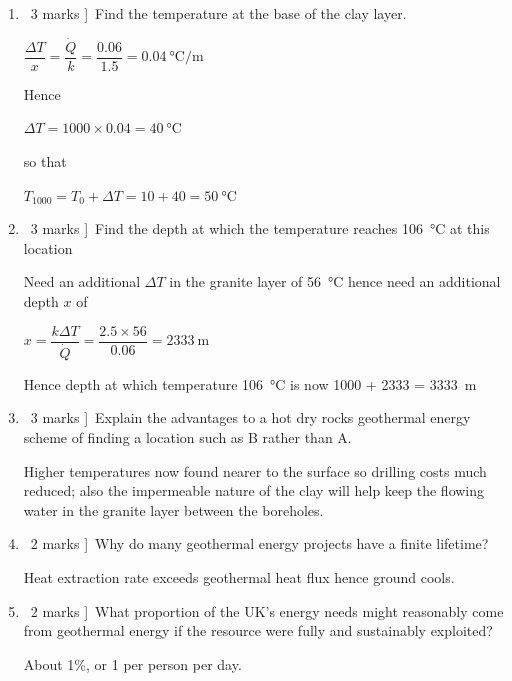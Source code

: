 \documentclass[a4paper,12pt,fleqn]{article}
\begin{document}
\begin{enumerate}[label=\alph*)]
\item \lbrack\ 3 marks ]\ Find the temperature at the base of the clay layer.\par
$\dfrac{\Delta T}{x}=\dfrac{\dot Q}{k}=\dfrac{0.06}{1.5}=\SI{0.04}{\celsius\per\metre}$\par
Hence\par
$\Delta T= 1000\times 0.04 = \SI{40}{\celsius}$\par
so that\par
$T_{1000}=T_0 + \Delta T = 10 + 40 = \SI{50}{\celsius}$\par
\item \lbrack\ 3 marks ]\ Find the depth at which the temperature reaches \SI{106}{\celsius} at this location\par
Need an additional $\Delta T$ in the granite layer of \SI{56}{\celsius} hence need an additional depth $x$ of\par
$x=\dfrac{k \Delta T}{\dot Q}=\dfrac{2.5\times 56}{0.06}=\SI{2333}{\metre}$\par
Hence depth at which temperature \SI{106}{\celsius} is now 1000 + 2333 = \SI{3333}{\metre}
\item \lbrack\ 3 marks ]\ Explain the advantages to a hot dry rocks geothermal energy scheme of finding a location such as B rather than A.\par
Higher temperatures now found nearer to the surface so drilling costs much reduced; also the impermeable nature of the clay will help keep the flowing water in the granite layer between the boreholes.
\item \lbrack\ 2 marks ]\ Why do many geothermal energy projects have a finite lifetime?\par
Heat extraction rate exceeds geothermal heat flux hence ground cools.\par
\item \lbrack\ 2 marks ]\ What proportion of the UK's energy needs might reasonably come from geothermal energy if the resource were fully and sustainably exploited?\par
About 1\%, or \SI{1}{\kilowatthour} per person per day.
\end{enumerate}
\end{document}
